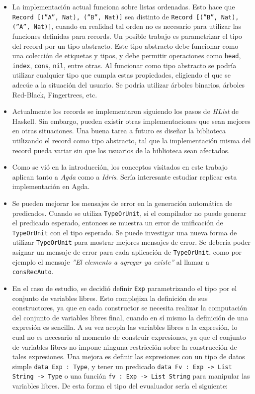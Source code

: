\begin{itemize}
\item La implementación actual funciona sobre listas ordenadas. Esto hace que \texttt{Record [(''A'', Nat), (''B'', Nat)]} sea distinto de \texttt{Record [(''B'', Nat), (''A'', Nat)]}, cuando en realidad tal orden no es necesario para utilizar las funciones definidas para records. Un posible trabajo es parametrizar el tipo del record por un tipo abstracto. Este tipo abstracto debe funcionar como una colección de etiquetas y tipos, y debe permitir operaciones como \texttt{head}, \texttt{index}, \texttt{cons}, \texttt{nil}, entre otras. Al funcionar como tipo abstracto se podría utilizar cualquier tipo que cumpla estas propiedades, eligiendo el que se adecúe a la situación del usuario. Se podría utilizar árboles binarios, árboles Red-Black, Fingertrees, etc.

\item Actualmente los records se implementaron siguiendo los pasos de \textit{HList} de Haskell. Sin embargo, pueden existir otras implementaciones que sean mejores en otras situaciones. Una buena tarea a futuro es diseñar la biblioteca utilizando el record como tipo abstracto, tal que la implementación misma del record pueda variar sin que los usuarios de la biblioteca sean afectados.

\item Como se vió en la introducción, los conceptos visitados en este trabajo aplican tanto a \textit{Agda} como a \textit{Idris}. Sería interesante estudiar replicar esta implementación en Agda.

\item Se pueden mejorar los mensajes de error en la generación automática de predicados. Cuando se utiliza \texttt{TypeOrUnit}, si el compilador no puede generar el predicado esperado, entonces se muestra un error de unificación de \texttt{TypeOrUnit} con el tipo esperado. Se puede investigar una nueva forma de utilizar \texttt{TypeOrUnit} para mostrar mejores mensajes de error. Se debería poder asignar un mensaje de error para cada aplicación de \texttt{TypeOrUnit}, como por ejemplo el mensaje \textit{''El elemento a agregar ya existe''} al llamar a \texttt{consRecAuto}.

\item En el caso de estudio, se decidió definir \texttt{Exp} parametrizando el tipo por el conjunto de variables libres. Esto complejiza la definición de sus constructores, ya que en cada constructor se necesita realizar la computación del conjunto de variables libres final, cuando en sí mismo la definición de una expresión es sencilla. A su vez acopla las variables libres a la expresión, lo cual no es necesario al momento de construir expresiones, ya que el conjunto de variables libres no impone ninguna restricción sobre la construcción de tales expresiones. Una mejora es definir las expresiones con un tipo de datos simple \texttt{data Exp : Type}, y tener un predicado \texttt{data Fv : Exp -> List String -> Type} o una función \texttt{fv : Exp -> List String} para manipular las variables libres. De esta forma el tipo del evualuador sería el siguiente:


\end{itemize}
